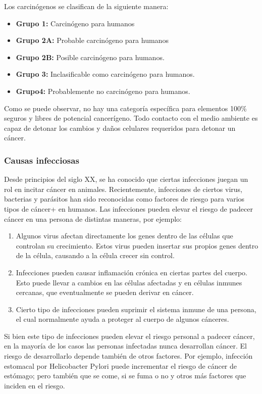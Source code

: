 Los carcinógenos se clasifican de la siguiente manera:
\begin{itemize}
    \item{\textbf{Grupo 1: }} Carcinógeno para humanos
    \item{\textbf{Grupo 2A: }} Probable carcinógeno para humanos
    \item{\textbf{Grupo 2B: }} Posible carcinógeno para humanos.
    \item{\textbf{Grupo 3: }} Inclasificable como carcinógeno para humanos.
    \item{\textbf{Grupo4: }} Probablemente no carcinógeno para humanos.  
\end{itemize}

Como se puede observar, no hay una categoría específica para elementos 100\%
seguros y libres de potencial cancerígeno. Todo contacto con el medio ambiente
es capaz de detonar los cambios y daños celulares requeridos para detonar un
cáncer.

\subsubsection{Causas infecciosas}

Desde principios del siglo XX, se ha conocido que ciertas infecciones juegan un
rol en incitar cáncer en animales. Recientemente, infecciones de ciertos virus,
bacterias y parásitos han sido reconocidas como factores de riesgo para varios
tipos de cáncer+ en humanos. Las infecciones pueden elevar el riesgo de padecer
cáncer en una persona de distintas maneras, por ejemplo:

\begin{enumerate}
    \item Algunos virus afectan directamente los genes dentro de las células que
    controlan su crecimiento. Estos virus pueden insertar sus propios genes
    dentro de la célula, causando a la célula crecer sin control.
    \item Infecciones pueden causar inflamación crónica en ciertas partes del
    cuerpo. Esto puede llevar a cambios en las células afectadas y en células
    inmunes cercanas, que eventualmente se pueden derivar en cáncer.
    \item Cierto tipo de infecciones pueden suprimir el sistema inmune de una
    persona, el cual normalmente ayuda a proteger al cuerpo de algunos cánceres.
\end{enumerate}

Si bien este tipo de infecciones pueden elevar el riesgo personal a padecer
cáncer, en la mayoría de los casos las personas infectadas nunca desarrollan
cáncer. El riesgo de desarrollarlo depende también de otros factores. Por
ejemplo, infección estomacal por Helicobacter Pylori puede incrementar el riesgo
de cáncer de estómago; pero también que se come, si se fuma o no y otros más
factores que inciden en el riesgo. 

